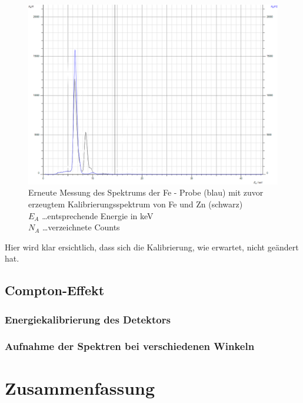 \documentclass[12pt,english,ngerman]{scrartcl}
\begin{document}
\begin{figure}[H]
	\begin{center}
		\includegraphics[width =\textwidth]{./figures/roentgen/KalibrieungErhaltenFe.png}
	\end{center}
	\caption[Erneute Messung des Spektrums der Fe - Probe] {Erneute Messung des Spektrums
		der Fe - Probe (blau) mit zuvor erzeugtem Kalibrierungsspektrum von Fe und Zn
		(schwarz)                                \\
		$E_A$ \dots entsprechende Energie in keV \\
		$N_A$ \dots verzeichnete Counts
	}\label{fig:fe_zumSchluss}
\end{figure}

Hier wird klar ersichtlich, dass sich die Kalibrierung, wie erwartet, nicht
geändert hat.

\subsection{Compton-Effekt}

\subsubsection{Energiekalibrierung des Detektors}

\subsubsection{Aufnahme der Spektren bei verschiedenen Winkeln}

\section{Zusammenfassung}\label{sec:zusammenfassung}
\end{document}
